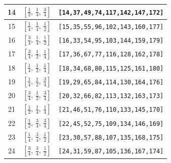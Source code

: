 \documentclass[fleqn,8pt]{jsarticle}
\begin{document}
\begin{longtable}{ccc}
14 & $\left[ \frac{1}{2},\, \frac{1}{4},\, \frac{3}{4} \right]$ & {\tt [14,37,49,74,117,142,147,172]} \\ \hline
15 & $\left[ \frac{1}{4},\, \frac{1}{4},\, \frac{1}{2} \right]$ & {\tt [15,35,55,96,102,143,160,177]} \\ \hline
16 & $\left[ \frac{3}{4},\, \frac{1}{4},\, \frac{1}{2} \right]$ & {\tt [16,33,54,95,103,144,159,179]} \\ \hline
17 & $\left[ \frac{3}{4},\, \frac{1}{2},\, \frac{1}{4} \right]$ & {\tt [17,36,67,77,116,128,162,178]} \\ \hline
18 & $\left[ \frac{1}{4},\, \frac{1}{2},\, \frac{1}{4} \right]$ & {\tt [18,34,68,80,115,125,161,180]} \\ \hline
19 & $\left[ \frac{1}{4},\, \frac{1}{2},\, \frac{3}{4} \right]$ & {\tt [19,29,65,84,114,130,164,176]} \\ \hline
20 & $\left[ \frac{3}{4},\, \frac{1}{2},\, \frac{3}{4} \right]$ & {\tt [20,32,66,82,113,132,163,173]} \\ \hline
21 & $\left[ \frac{1}{2},\, \frac{1}{4},\, \frac{1}{4} \right]$ & {\tt [21,46,51,76,110,133,145,170]} \\ \hline
22 & $\left[ \frac{1}{2},\, \frac{3}{4},\, \frac{3}{4} \right]$ & {\tt [22,45,52,75,109,134,146,169]} \\ \hline
23 & $\left[ \frac{1}{4},\, \frac{3}{4},\, \frac{1}{2} \right]$ & {\tt [23,30,57,88,107,135,168,175]} \\ \hline
24 & $\left[ \frac{3}{4},\, \frac{3}{4},\, \frac{1}{2} \right]$ & {\tt [24,31,59,87,105,136,167,174]} \\
\end{longtable}
\renewcommand{\arraystretch}{1.2}
\end{document}
